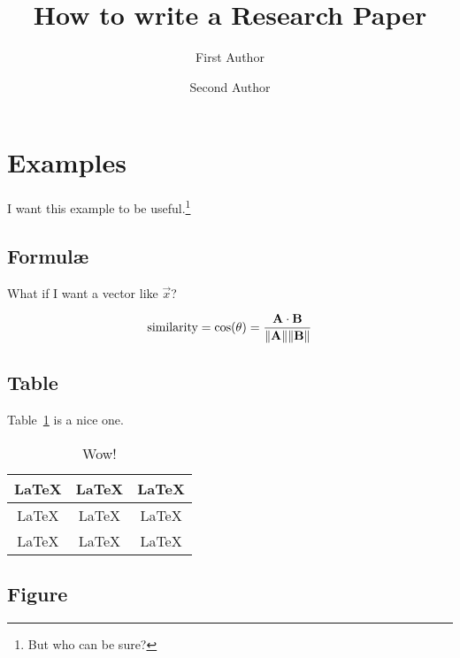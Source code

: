 \documentclass[a4paper]{article}
\date{}
\begin{document}

\let\newpage\relax\maketitle

\title{How to write a Research Paper}
\author{First Author \and Second Author}
\maketitle

\section{Examples}

I want this example to be useful.\footnote{But who can be sure?}

\subsection{Formul\ae}

What if I want a vector like $\vec{x}$?

\begin{equation}
  \text{similarity} = \cos(\theta) = {\mathbf{A} \cdot \mathbf{B} \over \|\mathbf{A}\| \|\mathbf{B}\|}
\end{equation}

\subsection{Table}

Table~\ref{tab:example} is a nice one.

\begin{table}[htbp]
\centering
\caption{\label{tab:example}Wow!}
\begin{tabular}{|c|c|c|}\hline
\LaTeX & \LaTeX & \LaTeX \\\hline
\LaTeX & \LaTeX & \LaTeX \\\hline
\LaTeX & \LaTeX & \LaTeX \\\hline
\end{tabular}
\end{table}

\subsection{Figure}
\end{document}
